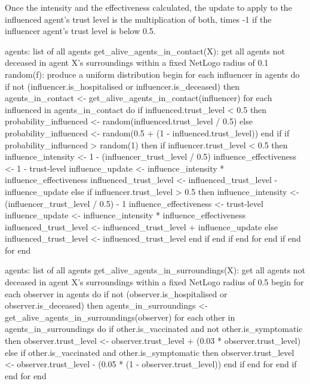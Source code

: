 Once the intensity and the effectiveness calculated, the update to apply to the influenced agent's trust level is the multiplication of both, times -1 if the influencer agent's trust level is below 0.5.

\pagebreak

\begin{algorithm}[language=Pseudocode, caption={Interpersonal influence over trust}, label={pseudo_code_interpersonal}]
agents: list of all agents
get_alive_agents_in_contact(X): get all agents not deceased in agent X's surroundings within a fixed NetLogo radius of 0.1
random(f): produce a uniform distribution
begin
    for each influencer in agents do
        if not (influencer.is_hospitalised or influencer.is_deceased) then
            agents_in_contact <- get_alive_agents_in_contact(influencer)
            for each influenced in agents_in_contact do
                if influenced.trust_level < 0.5 then
                    probability_influenced <- random(influenced.trust_level / 0.5)
                else
                    probability_influenced <- random(0.5 + (1 - influenced.trust_level))
                end if
                if probability_influenced > random(1) then
                    if influencer.trust_level < 0.5 then
                        influence_intensity <- 1 - (influencer_trust_level / 0.5)
                        influence_effectiveness <- 1 - trust-level
                        influence_update <- influence_intensity * influence_effectiveness
                        influenced_trust_level <- influenced_trust_level - influence_update
                    else if influencer.trust_level > 0.5 then
                        influence_intensity <- (influencer_trust_level / 0.5) - 1
                        influence_effectiveness <- trust-level
                        influence_update <- influence_intensity * influence_effectiveness
                        influenced_trust_level <- influenced_trust_level + influence_update
                    else
                        influenced_trust_level <- influenced_trust_level
                    end if
                end if
            end for
        end if
    end for
end
\end{algorithm}

\begin{algorithm}[language=Pseudocode, caption={Observational influence over trust}, label={pseudo_code_observational}]
agents: list of all agents
get_alive_agents_in_surroundings(X): get all agents not deceased in agent X's surroundings within a fixed NetLogo radius of 0.5
begin
    for each observer in agents do
        if not (observer.is_hospitalised or observer.is_deceased) then
            agents_in_surroundings <- get_alive_agents_in_surroundings(observer)
            for each other in agents_in_surroundings do
                if other.is_vaccinated and not other.is_symptomatic then
                    observer.trust_level <- observer.trust_level + (0.03 * observer.trust_level)
                else if other.is_vaccinated and other.is_symptomatic then
                    observer.trust_level <- observer.trust_level - (0.05 * (1 - observer.trust_level))
                end if
            end for
        end if
    end for
end
\end{algorithm}

